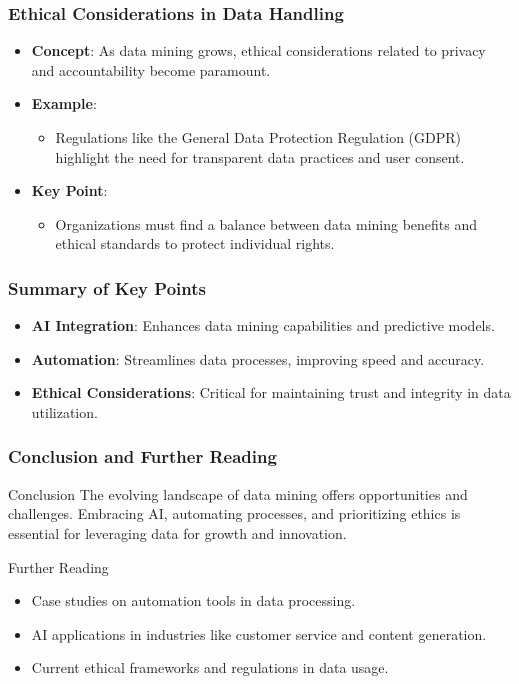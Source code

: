 \documentclass[aspectratio=169]{beamer}
\begin{document}
\begin{frame}[fragile]
    \frametitle{Ethical Considerations in Data Handling}
    \begin{itemize}
        \item \textbf{Concept}: As data mining grows, ethical considerations related to privacy and accountability become paramount.
        
        \item \textbf{Example}: 
        \begin{itemize}
            \item Regulations like the General Data Protection Regulation (GDPR) highlight the need for transparent data practices and user consent.
        \end{itemize}
        
        \item \textbf{Key Point}: 
        \begin{itemize}
            \item Organizations must find a balance between data mining benefits and ethical standards to protect individual rights.
        \end{itemize}
    \end{itemize}
\end{frame}

\begin{frame}[fragile]
    \frametitle{Summary of Key Points}
    \begin{itemize}
        \item \textbf{AI Integration}: Enhances data mining capabilities and predictive models.
        
        \item \textbf{Automation}: Streamlines data processes, improving speed and accuracy.
        
        \item \textbf{Ethical Considerations}: Critical for maintaining trust and integrity in data utilization.
    \end{itemize}
\end{frame}

\begin{frame}[fragile]
    \frametitle{Conclusion and Further Reading}
    \begin{block}{Conclusion}
        The evolving landscape of data mining offers opportunities and challenges. Embracing AI, automating processes, and prioritizing ethics is essential for leveraging data for growth and innovation.
    \end{block}
    
    \begin{block}{Further Reading}
        \begin{itemize}
            \item Case studies on automation tools in data processing.
            \item AI applications in industries like customer service and content generation.
            \item Current ethical frameworks and regulations in data usage.
        \end{itemize}
    \end{block}
\end{frame}
\end{document}
